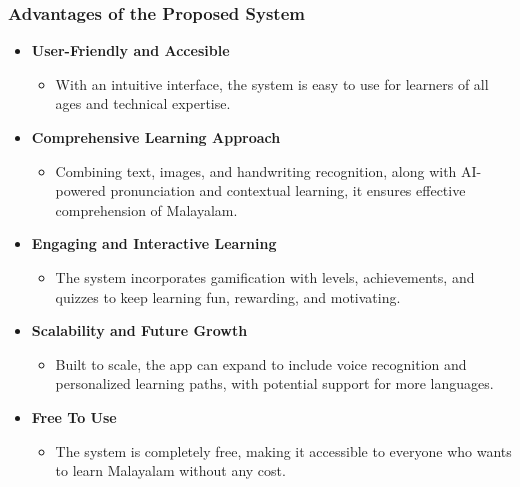 \documentclass[aspectratio=169]{beamer}
\begin{document}
\begin{frame}
    \frametitle{Advantages of the Proposed System}
    \begin{itemize}
        \item \textbf{User-Friendly and Accesible}     
        \begin{itemize}
            \item  With an intuitive interface, the system is easy to use for learners of all ages and technical expertise.
            
        \end{itemize}

        \item \textbf{Comprehensive Learning Approach}     
        \begin{itemize}
            \item Combining text, images, and handwriting recognition, along with AI-powered pronunciation and contextual learning, it ensures effective comprehension of Malayalam.
            
        \end{itemize}
        \item \textbf{Engaging and Interactive Learning}     
        \begin{itemize}
            \item The system incorporates gamification with levels, achievements, and quizzes to keep learning fun, rewarding, and motivating. 
            
        \end{itemize}
        \item \textbf{Scalability and Future Growth}     
        \begin{itemize}
            \item  Built to scale, the app can expand to include voice recognition and personalized learning paths, with potential support for more languages.
        \end{itemize}
        \item \textbf{Free To Use}     
        \begin{itemize}
            \item The system is completely free, making it accessible to everyone who wants to learn Malayalam without any cost.
        \end{itemize}
    \end{itemize}
\end{frame}
\end{document}
